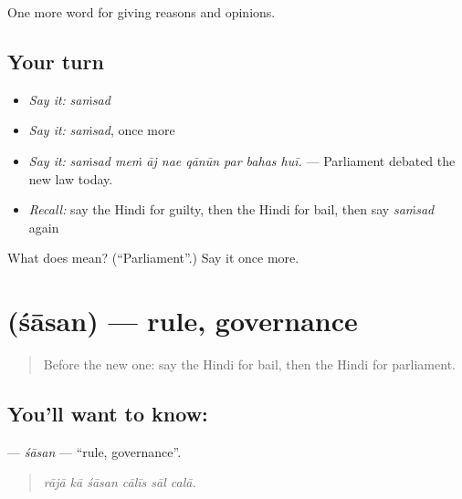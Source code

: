 \begin{grammarlens}[title={What you've built}]
One more word for giving reasons and opinions.
\end{grammarlens}

\subsection*{Your turn}
\begin{itemize}
\raggedright
  \item \emph{Say it:} \emph{saṁsad}
  \item \emph{Say it:} \emph{saṁsad}, once more
  \item \emph{Say it:} \emph{saṁsad meṁ āj nae qānūn par bahas huī.} — Parliament debated the new law today.
  \item \emph{Recall:} say the Hindi for guilty, then the Hindi for bail, then say \emph{saṁsad} again
\end{itemize}

\begin{tcolorbox}[breakable,colback=teal!4,colframe=teal!35!black,title={Before you move on}]
What does  mean? (\textquotedblleft{}Parliament\textquotedblright{}.) Say it once more.
\end{tcolorbox}
\section[\texorpdfstring{\hi{शासन} (śāsan)}{शासन (śāsan)}]{ (śāsan) — rule, governance}

\label{lesson:HI-C353-sasan}



\begin{quote}
Before the new one: say the Hindi for bail, then the Hindi for parliament.
\end{quote}

\subsection*{You'll want to know: }
\textbf{} — \emph{śāsan} — \textquotedblleft{}rule, governance\textquotedblright{}.

\begin{quote}
     
\end{quote}

\begin{quote}
\emph{rājā kā śāsan cālīs sāl calā.}
\end{quote}

